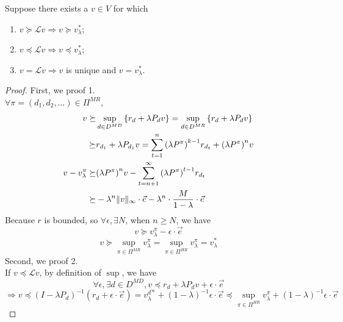 \begin{theorem}
    Suppose there exists a $ v \in V $ for which
    \begin{enumerate}
        \item $ v \succeq \mathcal{L} v \Rightarrow v \succeq v^*_\lambda $;
        \item $ v \preceq \mathcal{L} v \Rightarrow v \preceq v^*_\lambda$;
        \item $ v = \mathcal{L} v \Rightarrow v $ is unique and $ v = v^*_\lambda $.
    \end{enumerate}
    \begin{proof}
        First, we proof 1.\\
        $ \forall \pi = (d_1, d_2, \ldots) \in \Pi^{MR} $,
        \begin{align*}
            v \succeq& \sup_{d \in D^{MD}} \left\{ r_d + \lambda P_d v \right\} = \sup_{d \in D^{MR}} \left\{ r_d + \lambda P_d v \right\} \\
            \succeq& r_{d_1} + \lambda P_{d_1} v = \sum^{n}_{t=1} {(\lambda P^\pi)}^{k-1} r_{d_t} + {(\lambda P^\pi)}^n v\\
            v - v^\pi_\lambda \succeq& {(\lambda P^\pi)}^n v - \sum^{\infty}_{t = n+1} {(\lambda P^\pi)}^{t-1} r_{d_t} \\
            \succeq& - \lambda^n \Arrowvert v \Arrowvert_{\infty} \cdot \vec e
            - \lambda^n \cdot \frac{M}{1-\lambda} \cdot \vec e
        \end{align*}
        Because $ r $ is bounded, so $ \forall \epsilon, \exists N $, when $ n \ge N $, we have
        \[
            v \succeq v^\pi_\lambda - \epsilon \cdot \vec e
        \]
        \[
            v \succeq \sup_{\pi \in \Pi^{MR}} v^\pi_\lambda = \sup_{\pi \in \Pi^{HR}} v^\pi_\lambda = v^*_\lambda
        \]
        Second, we proof 2.\\
        If $ v \preceq \mathcal{L} v $, by definition of $ \sup $, we have
        \[
            \forall \epsilon, \exists d \in D^{MD}, v \preceq r_d + \lambda P_d v + \epsilon \cdot \vec e 
        \]
        \[
            \Rightarrow v \preceq {(I - \lambda P_d)}^{-1}(r_d + \epsilon \cdot \vec e)
        = v^{d^\infty}_{\lambda} + {(1 - \lambda)}^{-1} \epsilon \cdot \vec e
    \preceq \sup_{\pi \in \Pi^{HR}} v^\pi_{\lambda} + {(1-\lambda)}^{-1} \epsilon \cdot \vec e
        \]
    \end{proof}
\end{theorem}


